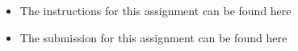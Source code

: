 \clearpage

\chapter{\documentName}
\section{\documentName}

\testimonial

\begin{itemize}
    \item The instructions for this assignment can be found here 
    \item The submission for this assignment can be found here 
\end{itemize}

